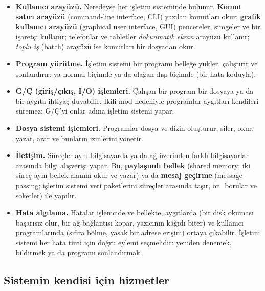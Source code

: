 \documentclass[11pt,a4paper]{article}
\newcommand{\term}[1]{\textbf{\color{mintdeep}#1}}
\begin{document}
\begin{itemize}
  \item \textbf{Kullanıcı arayüzü.} Neredeyse her işletim sisteminde bulunur. \term{Komut satırı arayüzü} (command-line interface, CLI) yazılan komutları okur; \term{grafik kullanıcı arayüzü} (graphical user interface, GUI) pencereler, simgeler ve bir işaretçi kullanır; telefonlar ve tabletler \emph{dokunmatik ekran} arayüzü kullanır; \emph{toplu iş} (batch) arayüzü ise komutları bir dosyadan okur.
  \item \textbf{Program yürütme.} İşletim sistemi bir programı belleğe yükler, çalıştırır ve sonlandırır: ya normal biçimde ya da olağan dışı biçimde (bir hata koduyla).
  \item \textbf{G/Ç (giriş/çıkış, I/O) işlemleri.} Çalışan bir program bir dosyaya ya da bir aygıta ihtiyaç duyabilir. İkili mod nedeniyle programlar aygıtları kendileri süremez; G/Ç'yi onlar adına işletim sistemi yapar.
  \item \textbf{Dosya sistemi işlemleri.} Programlar dosya ve dizin oluşturur, siler, okur, yazar, arar ve bunların izinlerini yönetir.
  \item \textbf{İletişim.} Süreçler aynı bilgisayarda ya da ağ üzerinden farklı bilgisayarlar arasında bilgi alışverişi yapar. Bu, \term{paylaşımlı bellek} (shared memory; iki süreç aynı bellek alanını okur ve yazar) ya da \term{mesaj geçirme} (message passing; işletim sistemi veri paketlerini süreçler arasında taşır, ör.\ borular ve soketler) ile yapılır.
  \item \textbf{Hata algılama.} Hatalar işlemcide ve bellekte, aygıtlarda (bir disk okuması başarısız olur, bir ağ bağlantısı kopar, yazıcının kâğıdı biter) ve kullanıcı programlarında (sıfıra bölme, yasak bir adrese erişim) ortaya çıkabilir. İşletim sistemi her hata türü için doğru eylemi seçmelidir: yeniden denemek, bildirmek ya da programı sonlandırmak.
\end{itemize}

\subsection{Sistemin kendisi için hizmetler}
\end{document}
